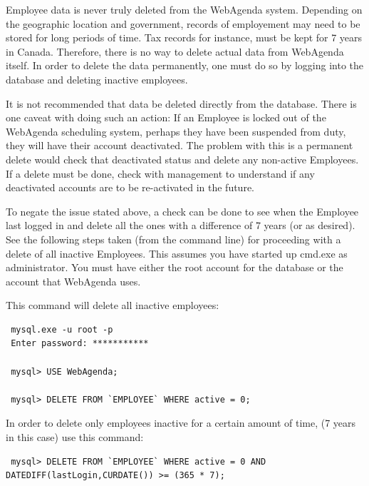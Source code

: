 \documentclass[a4paper,10pt]{report}
\begin{document}
\par \noindent \hspace*{1cm} Employee data is never truly deleted from the WebAgenda system. Depending on the geographic location and government, records of employement may need to be stored for long periods of time. Tax records for instance, must be kept for 7 years in Canada. Therefore, there is no way to delete actual data from WebAgenda itself. In order to delete the data permanently, one must do so by logging into the database and deleting inactive employees.
\bigskip
\par \noindent \hspace*{1cm} It is not recommended that data be deleted directly from the database. There is one caveat with doing such an action: If an Employee is locked out of the WebAgenda scheduling system, perhaps they have been suspended from duty, they will have their account deactivated. The problem with this is a permanent delete would check that deactivated status and delete any non-active Employees. If a delete must be done, check with management to understand if any deactivated accounts are to be re-activated in the future.
\bigskip
\par \noindent \hspace*{1cm} To negate the issue stated above, a check can be done to see when the Employee last logged in and delete all the ones with a difference of 7 years (or as desired). See the following steps taken (from the command line) for proceeding with a delete of all inactive Employees. This assumes you have started up cmd.exe as administrator. You must have either the root account for the database or the account that WebAgenda uses. 
\bigskip
\par \noindent \hspace*{1cm} This command will delete all inactive employees:

\begin{verbatim}
 mysql.exe -u root -p
 Enter password: ***********
 
 mysql> USE WebAgenda;
 
 mysql> DELETE FROM `EMPLOYEE` WHERE active = 0;
\end{verbatim}

\par \noindent \hspace*{1cm} In order to delete only employees inactive for a certain amount of time, (7 years in this case) use this command:

\begin{verbatim}
 mysql> DELETE FROM `EMPLOYEE` WHERE active = 0 AND DATEDIFF(lastLogin,CURDATE()) >= (365 * 7);
\end{verbatim}
\end{document}
